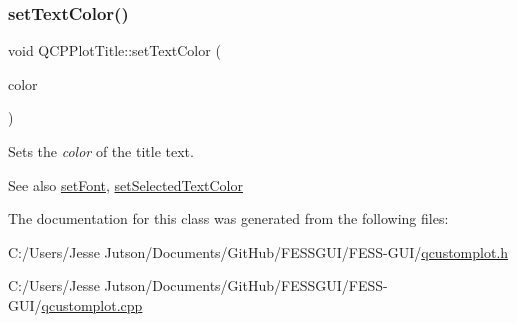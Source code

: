 \subsubsection{\texorpdfstring{set\+Text\+Color()}{setTextColor()}}
{\footnotesize\ttfamily void Q\+C\+P\+Plot\+Title\+::set\+Text\+Color (\begin{DoxyParamCaption}\item[{const Q\+Color \&}]{color }\end{DoxyParamCaption})}

Sets the {\itshape color} of the title text.

\begin{DoxySeeAlso}{See also}
\hyperlink{class_q_c_p_plot_title_a199fc7170802ea65006c371875349e37}{set\+Font}, \hyperlink{class_q_c_p_plot_title_a09ffd8c52ac8824d00382f84be391b66}{set\+Selected\+Text\+Color} 
\end{DoxySeeAlso}


The documentation for this class was generated from the following files\+:\begin{DoxyCompactItemize}
\item 
C\+:/\+Users/\+Jesse Jutson/\+Documents/\+Git\+Hub/\+F\+E\+S\+S\+G\+U\+I/\+F\+E\+S\+S-\/\+G\+U\+I/\hyperlink{qcustomplot_8h}{qcustomplot.\+h}\item 
C\+:/\+Users/\+Jesse Jutson/\+Documents/\+Git\+Hub/\+F\+E\+S\+S\+G\+U\+I/\+F\+E\+S\+S-\/\+G\+U\+I/\hyperlink{qcustomplot_8cpp}{qcustomplot.\+cpp}\end{DoxyCompactItemize}
